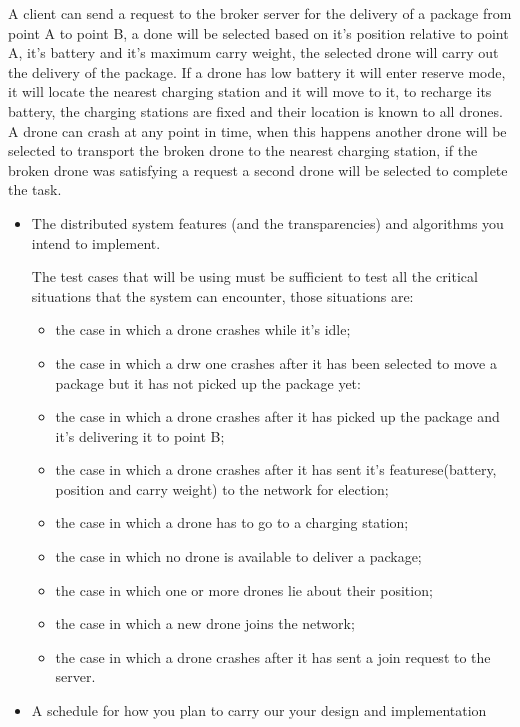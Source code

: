 \documentclass[a4paper, oneside]{memoir}
\begin{document}
A client can send a request to the broker server for the delivery of a package from point A to point B, a done will be selected based on it's position relative to point A, it's  battery and it's maximum carry weight, the selected drone will carry out the delivery of the package.
If a drone has low battery it will enter reserve mode, it will locate the nearest charging station and it will move to it, to recharge its battery, the charging stations are fixed and their location is known to all drones.\\
A drone can crash at any point in time, when this happens another drone will be selected to transport the broken drone to the nearest charging station, if the broken drone was satisfying a request a second drone will be selected to complete the task.

\begin{itemize}
\item The distributed system features (and the transparencies) and algorithms you intend to implement.


The test cases that will be using must be sufficient to test all the critical situations that the system can encounter, those situations are:
\begin{itemize}
\item the case in which a drone crashes while it's idle;
\item the case in which a drw one crashes after it has been selected to move a package but it has not picked up the package yet:
\item the case in which a drone crashes after it has picked up the package and it's delivering it to point B;
\item the case in which a drone crashes after it has sent it's featurese(battery, position and carry weight) to the network for election;
\item the case in which a drone has to go to a charging station;
\item the case in which no drone is available to deliver a package;
\item the case in which one or more drones lie about their position;
\item the case in which a new drone joins the network;
\item the case in which a drone crashes after it has sent a join request to the server.
\end{itemize}




\item A schedule for how you plan to carry our your design and implementation
\end{itemize}
\end{document}
